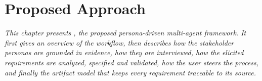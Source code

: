 \chapter{Proposed Approach}
\label{chap:proposed-approach}
\textit{This chapter presents \sysname{}, the proposed persona-driven multi-agent framework. It first gives an overview of the workflow, then describes how the stakeholder personas are grounded in evidence, how they are interviewed, how the elicited requirements are analyzed, specified and validated, how the user steers the process, and finally the artifact model that keeps every requirement traceable to its source.}









